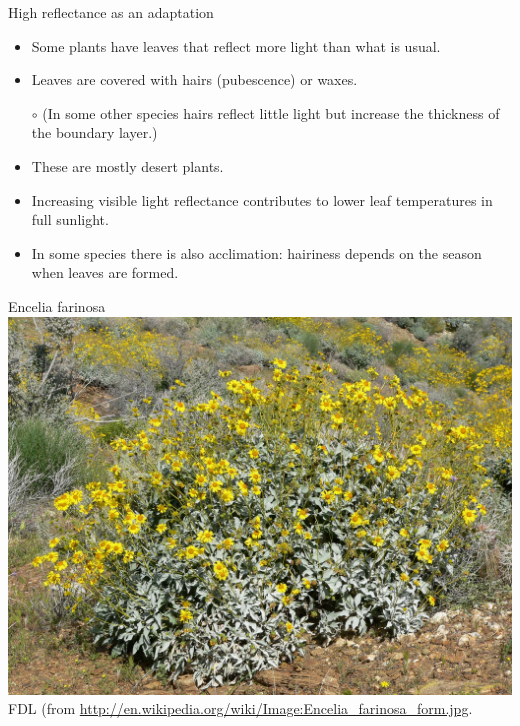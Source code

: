 \documentclass[10pt]{beamer}
\begin{document}
\begin{frame}{High reflectance as an adaptation}
    \begin{itemize}
        \item Some plants have leaves that reflect more light than
        what is usual.
        \item Leaves are covered with hairs (pubescence) or waxes.
        \item[$\circ$] (In some other species hairs reflect little light
        but increase the thickness of the boundary layer.)
        \item These are mostly desert plants.
        \item Increasing visible light reflectance contributes to
        lower leaf temperatures in full sunlight.
        \item In some species there is also acclimation: hairiness
        depends on the season when leaves are formed.
    \end{itemize}
\end{frame}

\begin{frame}{Encelia farinosa}
    \centering\includegraphics[height=0.7\textheight]{photos/Encelia_farinosa.jpg}\\
    {\tiny FDL (from \url{http://en.wikipedia.org/wiki/Image:Encelia_farinosa_form.jpg}.}
\end{frame}
\end{document}
